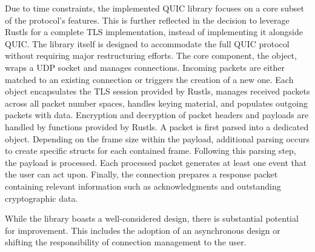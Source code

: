 Due to time constraints, the implemented QUIC library focuses on a core subset of the protocol's features. This is further reflected
in the decision to leverage Rustls for a complete TLS implementation, instead of implementing it alongside QUIC. The library itself
is designed to accommodate the full QUIC protocol without requiring major restructuring efforts.
The core component, the  object, wraps a UDP socket and manages connections. Incoming packets are either matched
to an existing connection or triggers the creation of a new one. Each  object encapsulates the TLS session
provided by Rustls, manages received packets across all packet number spaces, handles keying material, and populates outgoing packets
with data. Encryption and decryption of packet headers and payloads are handled by functions provided by Rustls.
A packet is first parsed into a dedicated  object. Depending on the frame size within the payload, additional parsing
occurs to create specific structs for each contained frame. Following this parsing step, the payload is processed. Each processed
packet generates at least one event that the user can act upon. Finally, the connection prepares a response packet containing
relevant information such as acknowledgments and outstanding cryptographic data.

While the library boasts a well-considered design, there is substantial potential for improvement. This includes the adoption of
an asynchronous design or shifting the responsibility of connection management to the user.